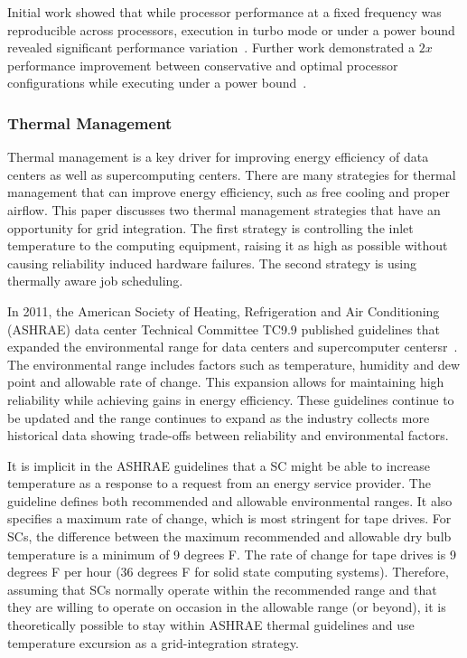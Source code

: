 Initial work showed that while processor performance at a fixed frequency 
was reproducible across processors, execution in turbo mode or under a power
bound revealed significant performance variation~\cite{Rountree2012}. Further
work demonstrated a $2x$ performance improvement between conservative and
optimal processor configurations while executing under a power bound~\cite{Patki1}.

\subsubsection{Thermal Management}

Thermal management is a key driver for improving energy efficiency of data
centers as well as supercomputing centers. There are many strategies for thermal
management that can improve energy efficiency, such as free cooling and proper
airflow. This paper discusses two thermal management strategies that have an
opportunity for grid integration. The first strategy is controlling the inlet
temperature to the computing equipment, raising it as high as possible without
causing reliability induced hardware failures. The second strategy is using
thermally aware job scheduling.

In 2011, the American Society of Heating, Refrigeration and Air Conditioning
(ASHRAE) data center Technical Committee TC9.9 published guidelines that
expanded the environmental range for data centers and supercomputer
centersr~\cite{ASHRAE:tgfdpe}. The environmental range includes factors such as temperature, humidity
and dew point and allowable rate of change. This expansion allows for
maintaining high reliability while achieving gains in energy efficiency. These
guidelines continue to be updated and the range continues to expand as the
industry collects more historical data showing trade-offs between reliability
and environmental factors.

It is implicit in the ASHRAE guidelines that a SC might be
able to increase temperature as a response to a request from an energy service
provider. The guideline defines both recommended and
allowable environmental ranges. It also specifies a maximum rate of
change, which is most stringent for tape drives. For SCs, the
difference between the maximum recommended and allowable dry bulb temperature is
a minimum of 9 degrees F. The rate of change for tape drives is 9 degrees F per
hour (36 degrees F for solid state computing systems). Therefore, assuming
that SCs normally operate within the recommended range and
that they are willing to operate on occasion in the allowable range (or beyond),
it is theoretically possible to stay within ASHRAE thermal guidelines and use
temperature excursion as a grid-integration strategy. 

